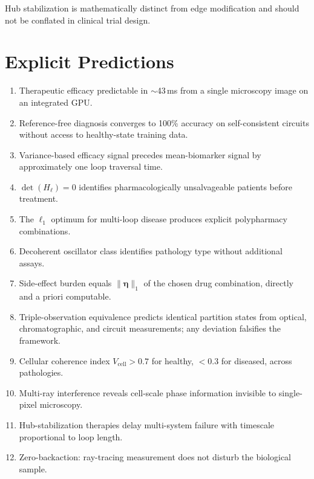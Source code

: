 \documentclass[twocolumn,10pt,a4paper]{article}
\theoremstyle{definition}
\theoremstyle{remark}
\newcommand{\Hol}{H}
\begin{document}
Hub stabilization is mathematically distinct from edge modification and should not be conflated in clinical trial design.

\section{Explicit Predictions}

\begin{enumerate}[leftmargin=*,itemsep=1pt]
    \item Therapeutic efficacy predictable in $\sim$43\,ms from a single microscopy image on an integrated GPU.
    \item Reference-free diagnosis converges to 100\% accuracy on self-consistent circuits without access to healthy-state training data.
    \item Variance-based efficacy signal precedes mean-biomarker signal by approximately one loop traversal time.
    \item $\det(\Hol_\ell) = 0$ identifies pharmacologically unsalvageable patients before treatment.
    \item The $\ell_1$ optimum for multi-loop disease produces explicit polypharmacy combinations.
    \item Decoherent oscillator class identifies pathology type without additional assays.
    \item Side-effect burden equals $\|\boldsymbol{\eta}\|_1$ of the chosen drug combination, directly and a priori computable.
    \item Triple-observation equivalence predicts identical partition states from optical, chromatographic, and circuit measurements; any deviation falsifies the framework.
    \item Cellular coherence index $V_{\mathrm{cell}} > 0.7$ for healthy, $<0.3$ for diseased, across pathologies.
    \item Multi-ray interference reveals cell-scale phase information invisible to single-pixel microscopy.
    \item Hub-stabilization therapies delay multi-system failure with timescale proportional to loop length.
    \item Zero-backaction: ray-tracing measurement does not disturb the biological sample.
\end{enumerate}

\end{document}
